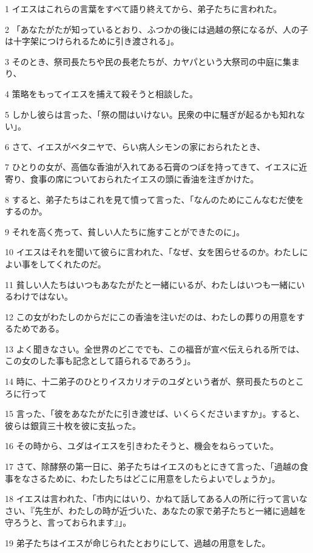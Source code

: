 \par 1 イエスはこれらの言葉をすべて語り終えてから、弟子たちに言われた。
\par 2 「あなたがたが知っているとおり、ふつかの後には過越の祭になるが、人の子は十字架につけられるために引き渡される」。
\par 3 そのとき、祭司長たちや民の長老たちが、カヤパという大祭司の中庭に集まり、
\par 4 策略をもってイエスを捕えて殺そうと相談した。
\par 5 しかし彼らは言った、「祭の間はいけない。民衆の中に騒ぎが起るかも知れない」。
\par 6 さて、イエスがベタニヤで、らい病人シモンの家におられたとき、
\par 7 ひとりの女が、高価な香油が入れてある石膏のつぼを持ってきて、イエスに近寄り、食事の席についておられたイエスの頭に香油を注ぎかけた。
\par 8 すると、弟子たちはこれを見て憤って言った、「なんのためにこんなむだ使をするのか。
\par 9 それを高く売って、貧しい人たちに施すことができたのに」。
\par 10 イエスはそれを聞いて彼らに言われた、「なぜ、女を困らせるのか。わたしによい事をしてくれたのだ。
\par 11 貧しい人たちはいつもあなたがたと一緒にいるが、わたしはいつも一緒にいるわけではない。
\par 12 この女がわたしのからだにこの香油を注いだのは、わたしの葬りの用意をするためである。
\par 13 よく聞きなさい。全世界のどこででも、この福音が宣べ伝えられる所では、この女のした事も記念として語られるであろう」。
\par 14 時に、十二弟子のひとりイスカリオテのユダという者が、祭司長たちのところに行って
\par 15 言った、「彼をあなたがたに引き渡せば、いくらくださいますか」。すると、彼らは銀貨三十枚を彼に支払った。
\par 16 その時から、ユダはイエスを引きわたそうと、機会をねらっていた。
\par 17 さて、除酵祭の第一日に、弟子たちはイエスのもとにきて言った、「過越の食事をなさるために、わたしたちはどこに用意をしたらよいでしょうか」。
\par 18 イエスは言われた、「市内にはいり、かねて話してある人の所に行って言いなさい、『先生が、わたしの時が近づいた、あなたの家で弟子たちと一緒に過越を守ろうと、言っておられます』」。
\par 19 弟子たちはイエスが命じられたとおりにして、過越の用意をした。
